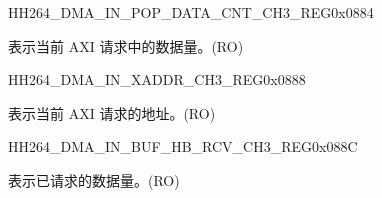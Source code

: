     
    \begin{register}{H}{H264\_DMA\_IN\_POP\_DATA\_CNT\_CH3\_REG}{0x0884}\label{regdesc:H264DMAINPOPDATACNTCH3REG}
    \regnewline%
    \begin{regdesc}\begin{reglist}
    \label{fielddesc:H264DMAINCMDFIFOPOPDATACNTCH3}\item [H264\_DMA\_IN\_CMDFIFO\_POP\_DATA\_CNT\_CH3] 表示当前 AXI 请求中的数据量。(RO)
    \end{reglist}\end{regdesc}
    \end{register}
    
    
    \begin{register}{H}{H264\_DMA\_IN\_XADDR\_CH3\_REG}{0x0888}\label{regdesc:H264DMAINXADDRCH3REG}
    \regnewline%
    \begin{regdesc}\begin{reglist}
    \label{fielddesc:H264DMAINCMDFIFOXADDRCH3}\item [H264\_DMA\_IN\_CMDFIFO\_XADDR\_CH3] 表示当前 AXI 请求的地址。(RO)
    \end{reglist}\end{regdesc}
    \end{register}
    
    
    \begin{register}{H}{H264\_DMA\_IN\_BUF\_HB\_RCV\_CH3\_REG}{0x088C}\label{regdesc:H264DMAINBUFHBRCVCH3REG}
    \regnewline%
    \begin{regdesc}\begin{reglist}
    \label{fielddesc:H264DMAINCMDFIFOBUFHBRCVCH3}\item [H264\_DMA\_IN\_CMDFIFO\_BUF\_HB\_RCV\_CH3] 表示已请求的数据量。(RO)
    \end{reglist}\end{regdesc}
    \end{register}
    
